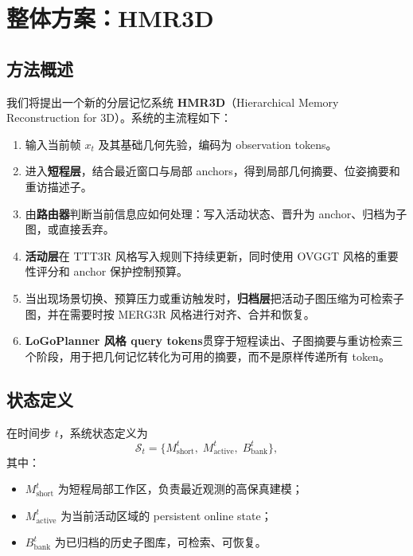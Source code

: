 \documentclass[12pt]{article}
\newcommand{\method}{\textbf{HMR3D}}
\begin{document}
\section{整体方案：\method{}}

\subsection{方法概述}

我们将提出一个新的分层记忆系统 \method{}（Hierarchical Memory Reconstruction for 3D）。系统的主流程如下：
\begin{enumerate}
  \item 输入当前帧 $x_t$ 及其基础几何先验，编码为 observation tokens。
  \item 进入\textbf{短程层}，结合最近窗口与局部 anchors，得到局部几何摘要、位姿摘要和重访描述子。
  \item 由\textbf{路由器}判断当前信息应如何处理：写入活动状态、晋升为 anchor、归档为子图，或直接丢弃。
  \item \textbf{活动层}在 TTT3R 风格写入规则下持续更新，同时使用 OVGGT 风格的重要性评分和 anchor 保护控制预算。
  \item 当出现场景切换、预算压力或重访触发时，\textbf{归档层}把活动子图压缩为可检索子图，并在需要时按 MERG3R 风格进行对齐、合并和恢复。
  \item \textbf{LoGoPlanner 风格 query tokens}贯穿于短程读出、子图摘要与重访检索三个阶段，用于把几何记忆转化为可用的摘要，而不是原样传递所有 token。
\end{enumerate}

\subsection{状态定义}

在时间步 $t$，系统状态定义为
\begin{equation}
\mathcal{S}_t = \{M_{\text{short}}^t,\; M_{\text{active}}^t,\; B_{\text{bank}}^t\},
\end{equation}
其中：
\begin{itemize}
  \item $M_{\text{short}}^t$ 为短程局部工作区，负责最近观测的高保真建模；
  \item $M_{\text{active}}^t$ 为当前活动区域的 persistent online state；
  \item $B_{\text{bank}}^t$ 为已归档的历史子图库，可检索、可恢复。
\end{itemize}
\end{document}
